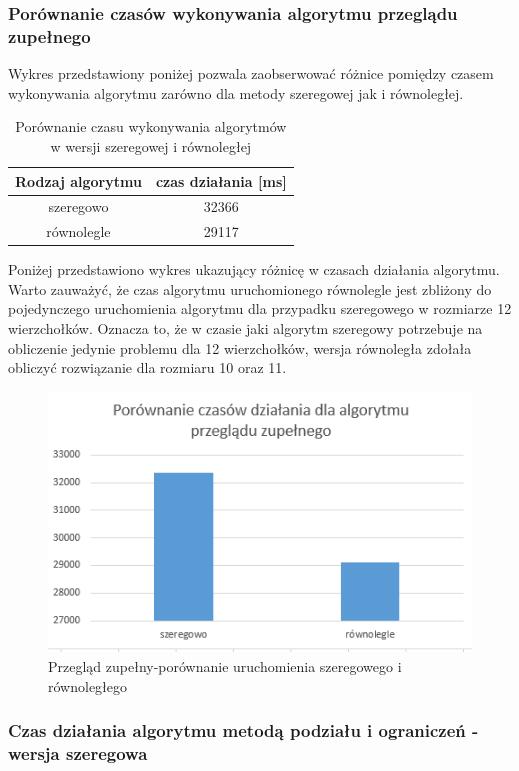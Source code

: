\documentclass{article}
\begin{document}
			
		\subsubsection{Porównanie czasów wykonywania algorytmu przeglądu zupełnego} 
		Wykres przedstawiony poniżej pozwala zaobserwować różnice pomiędzy czasem wykonywania algorytmu zarówno dla metody szeregowej jak i równoległej.
			\begin{table}[H]
				\centering
				\caption{Porównanie czasu wykonywania algorytmów w wersji szeregowej i równoległej}
				\begin{tabular}{|c|c|}
					\hline Rodzaj algorytmu & czas działania [ms] \\ 
					\hline szeregowo & 32366 \\ 
					\hline równolegle& 29117 \\ 
							
					\hline 
				\end{tabular} 
			\end{table}	
			
		Poniżej przedstawiono wykres ukazujący różnicę w czasach działania algorytmu. Warto zauważyć, że czas algorytmu uruchomionego równolegle jest zbliżony do pojedynczego uruchomienia algorytmu dla przypadku szeregowego w rozmiarze 12 wierzchołków. Oznacza to, że w czasie jaki algorytm szeregowy potrzebuje na obliczenie jedynie problemu dla 12 wierzchołków, wersja równoległa zdołała obliczyć rozwiązanie dla rozmiaru 10 oraz 11. 
		\begin{figure}[H]
			\centering
			\includegraphics[width=0.7\linewidth]{bfSvsR.png}
			\caption{Przegląd zupełny-porównanie uruchomienia szeregowego i równoległego}
		\end{figure}
		
	\subsubsection{Czas działania algorytmu metodą podziału i ograniczeń  - wersja szeregowa}
		
\end{document}
